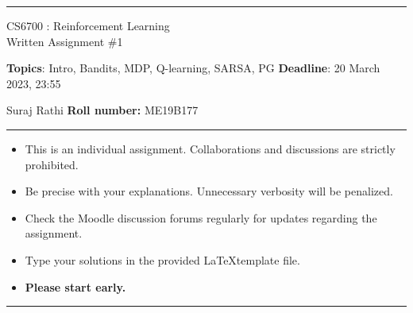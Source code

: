 \documentclass[addpoints,12pt,solution]{exam}
\begin{document}
\hrule
\vspace{1mm}
\noindent
\begin{center}
{\Large CS6700 : Reinforcement Learning} \\
{\large Written Assignment \#1}
\end{center}
\vspace{1mm}
\noindent
{\textbf{Topics}: Intro, Bandits, MDP, Q-learning, SARSA, PG \hfill \textbf{Deadline}: 20 March 2023, 23:55}


 Suraj Rathi  \hfill {\bf Roll number: } ME19B177
\vspace{2mm}
\hrule

{\small

\begin{itemize}\itemsep0mm
\item This is an individual assignment. Collaborations and discussions are strictly
prohibited.
\item Be precise with your explanations. Unnecessary verbosity will be penalized.
\item Check the Moodle discussion forums regularly for updates regarding the assignment.
\item Type your solutions in the provided \LaTeX template file.
\item \textbf{Please start early.}
\end{itemize}
}

\hrule

\vspace{3mm}




\end{document}
